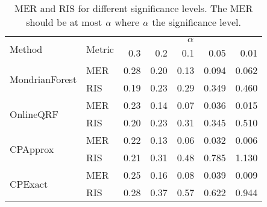 \begin{table}
	\centering
	\begin{tabular}{ll r r r r r}
		\toprule
		\multirow{2}{*}{Method} &  \multirow{2}{*}{Metric} &  \multicolumn{5}{c}{$\alpha$} \\
		\cmidrule(lr){3-7}
		& & 0.3 &   0.2 &   0.1 &   0.05 &   0.01 \\
		\midrule
		\multirow{2}{*}{MondrianForest}   & MER  & 0.28 & 0.20 & 0.13 &  0.094 &  0.062 \\
		& RIS  &  0.19 &  0.23 &  0.29 &   0.349 &   0.460 \\
		\midrule
		\multirow{2}{*}{OnlineQRF} & MER & 0.23 & 0.14 & 0.07 &  0.036 &  0.015 \\
		& RIS &  0.20 &  0.23 &  0.31 &   0.345 &   0.510 \\
		\midrule
		\multirow{2}{*}{CPApprox} & MER  & 0.22 & 0.13 & 0.06 &  0.032 &  0.006 \\
		& RIS &   0.21 &   0.31 &   0.48 &   0.785 &    1.130 \\
		\midrule
		\multirow{2}{*}{CPExact} & MER  & 0.25 & 0.16 & 0.08 &  0.039 &  0.009 \\
		& RIS &   0.28 &   0.37 &   0.57 &   0.622 &   0.944 \\
		\bottomrule
	\end{tabular}
	\caption{MER and RIS for different significance levels. The MER should be at most
		$\alpha$ where $\alpha$ the significance level.}
	\label{tab:uncertain-significance}
\end{table}

